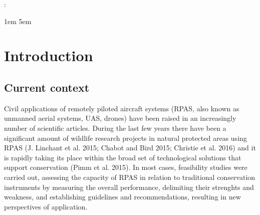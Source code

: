 \documentclass[]{interact}
\theoremstyle{plain}%
\theoremstyle{definition}
\theoremstyle{remark}
\begin{document}
    
 : \par
  \begingroup
  \leftskip1em
  \rightskip\leftskip
  \rightskip5em
  \par
  \endgroup
  \vspace{5mm}


% 

\vskip 6.5pt

\noindent  \section{Introduction}\label{introduction}

\subsection{Current context}\label{current-context}

Civil applications of remotely piloted aircraft systems (RPAS, also
known as unmanned aerial systems, UAS, drones) have been raised in an
increasingly number of scientific articles. During the last few years
there have been a significant amount of wildlife research projects in
natural protected areas using RPAS (J. Linchant et al. 2015; Chabot and
Bird 2015; Christie et al. 2016) and it is rapidly taking its place
within the broad set of technological solutions that support
conservation (Pimm et al. 2015). In most cases, feasibility studies were
carried out, assessing the capacity of RPAS in relation to traditional
conservation instruments by measuring the overall performance,
delimiting their strenghts and weakness, and establishing guidelines and
recommendations, resulting in new perspectives of application.
\end{document}
